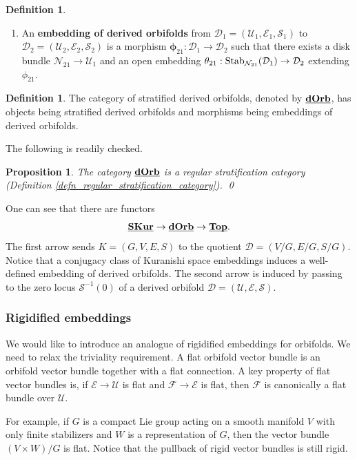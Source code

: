 \documentclass[reqno, 10pt]{amsart}
\numberwithin{equation}{section}
\numberwithin{equation}{section}
\newtheorem{prop}[thm]{Proposition}
\theoremstyle{definition}
\newtheorem{defn}[thm]{Definition}
\theoremstyle{remark}
\newcommand{\beqn}{\begin{equation*}}
\newcommand{\eeqn}{\end{equation*}}
\newcommand{\mc}{\mathcal}
\newcommand{\uds}[1]{\underline{\smash{#1}}}
\begin{document}
\begin{defn}
\begin{enumerate}
\item An {\bf embedding of derived orbifolds} from ${\mc D}_1 = ({\mc U}_1, {\mc E}_1, {\mc S}_1)$ to ${\mc D}_2 = ({\mc U}_2, {\mc E}_2, {\mc S}_2)$ is a morphism ${\bm \phi}_{21}: {\mc D}_1 \to {\mc D}_2$ such that  there exists a disk bundle ${\mc N}_{21} \to {\mc U}_1$ and an open embedding $\theta_{21}: {\rm Stab}_{{\mc N}_{21}}( {\mc D}_1) \to {\mc D}_2$ extending $\phi_{21}$. 
\end{enumerate}
\end{defn}


\begin{defn}
The category of stratified derived orbifolds, denoted by $\uds{\bf dOrb}$, has objects being stratified derived orbifolds and morphisms being embeddings of derived orbifolds. 
\end{defn}

The following is readily checked. 

\begin{prop}
The category $\uds{\bf dOrb}$ is a regular stratification category (Definition \ref{defn_regular_stratification_category}). \qed
\end{prop}

One can see that there are functors
\beqn
\uds{\bf S Kur}  \to \uds{\bf dOrb} \to \uds{\bf Top}.
\eeqn
The first arrow sends $K = (G, V, E, S)$ to the quotient ${\mc D} = (V/G, E/G, S/G)$. Notice that a conjugacy class of Kuranishi space embeddings induces a well-defined embedding of derived orbifolds. The second arrow is induced by passing to the zero locus ${\mc S}^{-1}(0)$ of a derived orbifold ${\mc D} = ({\mc U}, {\mc E}, {\mc S})$.



\subsubsection{Rigidified embeddings}

We would like to introduce an analogue of rigidified embeddings for orbifolds. We need to relax the triviality requirement. A flat orbifold vector bundle is an orbifold vector bundle together with a flat connection. A key property of flat vector bundles is, if ${\mc E} \to {\mc U}$ is flat and ${\mc F} \to {\mc E}$ is flat, then ${\mc F}$ is canonically a flat bundle over ${\mc U}$. %


For example, if $G$ is a compact Lie group acting on a smooth manifold $V$ with only finite stabilizers and $W$ is a representation of $G$, then the vector bundle $(V\times W)/G$ is flat. %
Notice that the pullback of rigid vector bundles is still rigid. 
\end{document}
